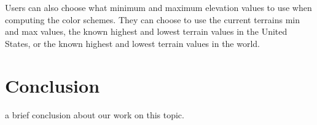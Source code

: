 Users can also choose what minimum and maximum elevation values to use when computing the color schemes.  They can choose to use the current terrains min and max values, the known highest and lowest terrain values in the United States, or the known highest and lowest terrain values in the world.


\section{Conclusion}
a brief conclusion about our work on this topic.
